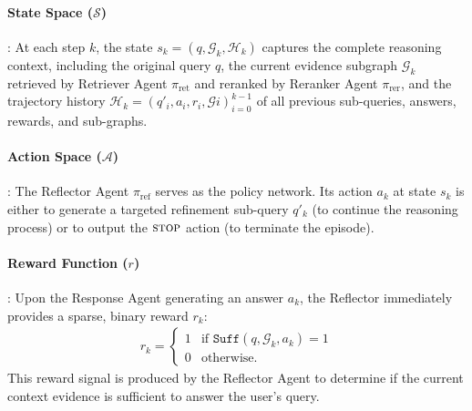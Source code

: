 
\paragraph{State Space ($\mathcal{S}$)}: At each step $k$, the state $s_k = (q, \mathcal{G}_k, \mathcal{H}_k)$ captures the complete reasoning context, including the original query $q$, the current evidence subgraph $\mathcal{G}_k$ retrieved by Retriever Agent $\pi_{\text{ret}}$ and reranked by Reranker Agent $\pi_{\text{rer}}$, and the trajectory history $\mathcal{H}_k = {(q'_i, a_i, r_i, \mathcal{G}i)}_{i=0}^{k-1}$ of all previous sub-queries, answers, rewards, and sub-graphs.

\paragraph{Action Space ($\mathcal{A}$)}: The Reflector Agent $\pi_{\text{ref}}$ serves as the policy network. Its action $a_k$ at state $s_k$ is either to generate a targeted refinement sub-query $q'_k$ (to continue the reasoning process) or to output the $\textsc{stop}$ action (to terminate the episode).

\paragraph{Reward Function ($r$)}: Upon the Response Agent generating an answer $a_k$, the Reflector immediately provides a sparse, binary reward $r_k$:
\begin{align}
    r_k = \begin{cases}
        1 & \text{if } \texttt{Suff}(q, \mathcal{G}_k, a_k) = 1\\
        0 & \text{otherwise.}
    \end{cases}
\end{align}
This reward signal is produced by the Reflector Agent to determine if the current context evidence is sufficient to answer the user's query. 

